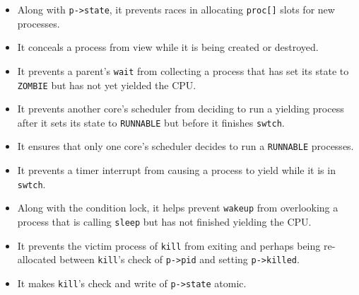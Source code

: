 \begin{itemize}

\item Along with \lstinline{p->state}, it prevents races in allocating
  \lstinline{proc[]} slots for new processes.

\item It conceals a process from view while it is being created
or destroyed.

\item It prevents a parent's \lstinline{wait} from collecting a
process that has set its state to \lstinline{ZOMBIE} but has
not yet yielded the CPU.

\item It prevents another core's scheduler from deciding to run
a yielding process after it sets its state to \lstinline{RUNNABLE} but
before it finishes \lstinline{swtch}.

\item It ensures that only one core's scheduler decides to run a
  \lstinline{RUNNABLE} processes.

\item It prevents a timer interrupt from causing a process to
yield while it is in \lstinline{swtch}.

\item Along with the condition lock, it helps prevent \lstinline{wakeup}
from overlooking a process that is calling \lstinline{sleep} but has not
finished yielding the CPU.

\item It prevents the victim process of \lstinline{kill} from exiting
and perhaps being re-allocated between \lstinline{kill}'s check of 
\lstinline{p->pid} and setting \lstinline{p->killed}.

\item It makes \lstinline{kill}'s check and write of \lstinline{p->state}
atomic.

\end{itemize}


